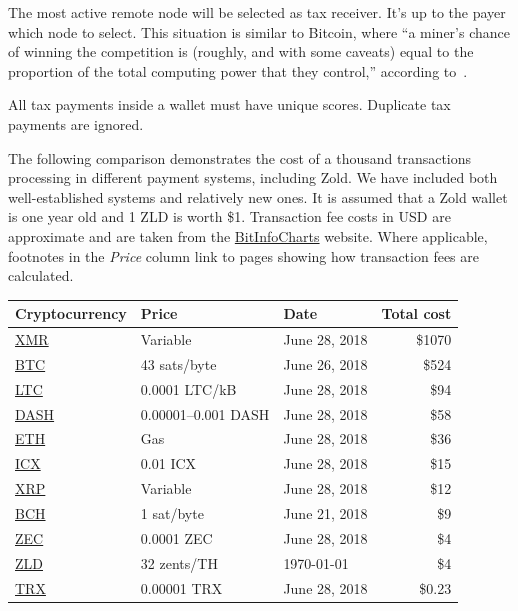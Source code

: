 \documentclass[11pt,oneside]{article}
\begin{document}
The most active remote node will be selected as tax receiver.
It's up to the payer which node to select. This situation is similar
to Bitcoin, where ``a miner's chance of winning the
competition is (roughly, and with some caveats) equal to the proportion of the total computing
power that they control,'' according to~\textcite{foroglou2015}.

All tax payments inside a wallet must have unique scores.
Duplicate tax payments are ignored.

The following comparison demonstrates the cost of a thousand transactions
processing in different payment systems, including Zold. We have included both well-established systems and relatively new ones.
It is assumed that a Zold wallet is one year old
and 1 ZLD is worth \$1. Transaction fee costs in USD are approximate and are taken from the \href{https://bitinfocharts.com/}{BitInfoCharts} website. Where applicable, footnotes in the \textit{Price} column link to pages showing how transaction fees are calculated.

\begin{tabular}{lllr}
\hline
Cryptocurrency & Price & Date & Total cost \\
\hline
\href{https://getmonero.org/}{XMR} &
   Variable\footnotemark &
   June 28, 2018 &
   \$1070 \\
\href{https://bitcoin.org}{BTC} &
  43 sats/byte\footnotemark &
  June 26, 2018 &
  \$524 \\
\href{https://litecoin.org/}{LTC} &
  0.0001 LTC/kB\footnotemark &
  June 28, 2018 &
  \$94 \\
\href{https://www.dash.org/}{DASH} &
  0.00001--0.001 DASH\footnotemark &
  June 28, 2018 &
  \$58 \\
\href{https://www.ethereum.org/}{ETH} &
  Gas\footnotemark &
  June 28, 2018 &
  \$36 \\
\href{https://icon.foundation/}{ICX} &
  0.01 ICX\footnotemark &
  June 28, 2018 &
  \$15 \\
\href{https://ripple.com/xrp/}{XRP} &
   Variable\footnotemark &
   June 28, 2018 &
   \$12 \\
\href{https://www.bitcoincash.org/}{BCH} &
  1 sat/byte &
  June 21, 2018 &
  \$9 \\
\href{https://z.cash/}{ZEC} &
   0.0001 ZEC\footnotemark &
   June 28, 2018 &
   \$4 \\
\href{http://www.zold.io/}{ZLD} &
  32 zents/TH &
  \today &
  \$4 \\
\href{https://tron.network/}{TRX} &
  0.00001 TRX\footnotemark &
  June 28, 2018 &
  \$0.23 \\
\hline
\end{tabular}
\end{document}
